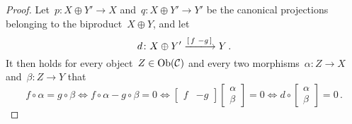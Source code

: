 \begin{proof}
  Let~$p \colon X \oplus Y' \to X$ and~$q \colon X \oplus Y' \to Y'$ be the canonical projections belonging to the biproduct~$X \oplus Y$, and let
  \[
      d
    \colon
      X \oplus Y'
    \xlongto{\begin{bsmallmatrix} f & -g \end{bsmallmatrix}}
      Y \,.
  \]
  It then holds for every object~$Z \in \operatorname{Ob}(\mathcal{C})$ and every two morphisms~$\alpha \colon Z \to X$ and~$\beta \colon Z \to Y$ that
  \[
          f \circ \alpha = g \circ \beta
    \iff  f \circ \alpha - g \circ \beta = 0
    \iff  \begin{bmatrix}
            f & -g
          \end{bmatrix}
          \begin{bmatrix}
            \alpha  \\
            \beta
          \end{bmatrix}
          = 0
    \iff  d
          \circ
          \begin{bmatrix}
            \alpha  \\
            \beta
          \end{bmatrix}
          = 0 \,.
  \]
  

\end{proof}
